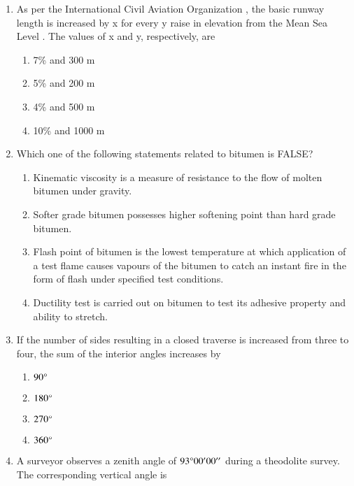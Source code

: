 \documentclass[journal,12pt,onecolumn]{article}
\theoremstyle{remark}
\begin{document}
\begin{enumerate}
    \item As per the International Civil Aviation Organization , the basic runway length is increased by x \brak{\%} for every y  raise in elevation from the Mean Sea Level . The values of x and y, respectively, are
    
    \hfill{}
    \begin{enumerate}
        \item 7\% and 300 m
        \item 5\% and 200 m
        \item 4\% and 500 m
        \item 10\% and 1000 m
    \end{enumerate}

    \item Which one of the following statements related to bitumen is FALSE?
    
    \hfill{}
    \begin{enumerate}
        \item Kinematic viscosity is a measure of resistance to the flow of molten bitumen under gravity.
        \item Softer grade bitumen possesses higher softening point than hard grade bitumen.
        \item Flash point of bitumen is the lowest temperature at which application of a test flame causes vapours of the bitumen to catch an instant fire in the form of flash under specified test conditions.
        \item Ductility test is carried out on bitumen to test its adhesive property and ability to stretch.
    \end{enumerate}

    \item If the number of sides resulting in a closed traverse is increased from three to four, the sum of the interior angles increases by
    
    \hfill{}
    \begin{enumerate}
        \item $90\degree$
        \item $180\degree$
        \item $270\degree$
        \item $360\degree$
    \end{enumerate}

    \item A surveyor observes a zenith angle of $93\degree 00' 00''$ during a theodolite survey. The corresponding vertical angle is
    

\end{enumerate}
\end{document}
